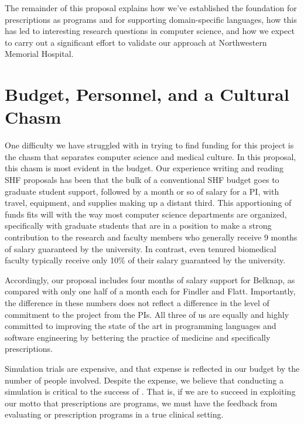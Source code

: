 \documentclass[11pt]{article}
\begin{document}
The remainder of this proposal explains how we've established the
foundation for prescriptions as programs and for supporting
domain-specific languages, how this has led to interesting research
questions in computer science, and how we expect to carry out a
significant effort to validate our approach at Northwestern Memorial
Hospital.







\section{Budget, Personnel, and a Cultural Chasm}

One difficulty we have struggled with in trying to find funding for
this project is the chasm that separates computer science and medical
culture.
%
In this proposal, this chasm is most evident in the budget. 
%
Our experience writing and reading SHF proposals has been that the
bulk of a conventional SHF budget goes to graduate student support,
followed by a month or so of salary for a PI, with travel,
equipment, and supplies making up a distant third.
%
This apportioning of funds fits will with the way most computer
science departments are organized, specifically with graduate students
that are in a position to make a strong contribution to the research
and faculty members who generally receive 9 months of salary
guaranteed by the university.
%
In contrast, even tenured biomedical faculty typically receive only
10\% of their salary guaranteed by the university.

Accordingly, our proposal includes four months of salary support for
Belknap, as compared with only one half of a month each for Findler
and Flatt.
%
Importantly, the difference in these numbers does not reflect a
difference in the level of commitment to the project from the PIs.
%
All three of us are equally and highly committed to improving the
state of the art in programming languages and software engineering by
bettering the practice of medicine and specifically prescriptions.


Simulation trials are expensive, and that expense is reflected in our
budget by the number of people involved.
%
Despite the expense, we believe that conducting a simulation is
critical to the success of \poppl{}.
%
That is, if we are to succeed in exploiting our motto that
prescriptions are programs, we must have the feedback from evaluating
or prescription programs in a true clinical setting.
\end{document}
